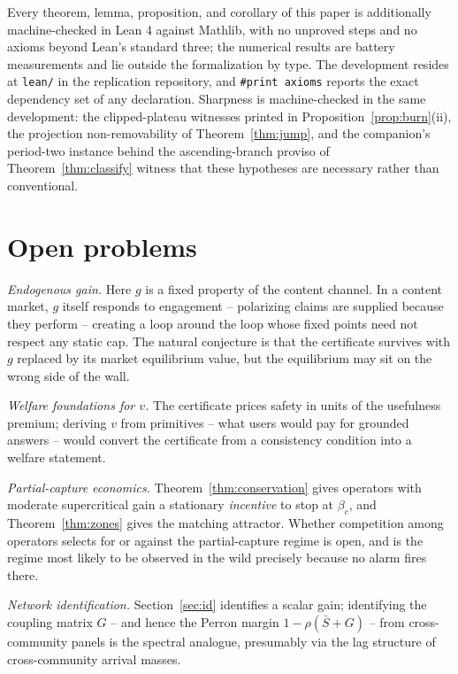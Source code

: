 \documentclass[11pt]{article}
\theoremstyle{definition}
\theoremstyle{remark}
\numberwithin{equation}{section}
\begin{document}
Every theorem, lemma, proposition, and corollary of this paper is additionally machine-checked in Lean 4 against Mathlib, with no unproved steps and no axioms beyond Lean's standard three; the numerical results are battery measurements and lie outside the formalization by type. The development resides at \texttt{lean/} in the replication repository, and \texttt{\#print axioms} reports the exact dependency set of any declaration. Sharpness is machine-checked in the same development: the clipped-plateau witnesses printed in Proposition~\ref{prop:burn}(ii), the projection non-removability of Theorem~\ref{thm:jump}, and the companion's period-two instance behind the ascending-branch proviso of Theorem~\ref{thm:classify} witness that these hypotheses are necessary rather than conventional.

\section{Open problems}\label{sec:open}

\emph{Endogenous gain.} Here $g$ is a fixed property of the content channel. In a content market, $g$ itself responds to engagement -- polarizing claims are supplied because they perform -- creating a loop around the loop whose fixed points need not respect any static cap. The natural conjecture is that the certificate survives with $g$ replaced by its market equilibrium value, but the equilibrium may sit on the wrong side of the wall.

\emph{Welfare foundations for $v$.} The certificate prices safety in units of the usefulness premium; deriving $v$ from primitives -- what users would pay for grounded answers -- would convert the certificate from a consistency condition into a welfare statement.

\emph{Partial-capture economics.} Theorem~\ref{thm:conservation} gives operators with moderate supercritical gain a stationary \emph{incentive} to stop at $\beta_c$, and Theorem~\ref{thm:zones} gives the matching attractor. Whether competition among operators selects for or against the partial-capture regime is open, and is the regime most likely to be observed in the wild precisely because no alarm fires there.

\emph{Network identification.} Section~\ref{sec:id} identifies a scalar gain; identifying the coupling matrix $G$ -- and hence the Perron margin $1-\rho(\bar S+G)$ -- from cross-community panels is the spectral analogue, presumably via the lag structure of cross-community arrival masses.
\end{document}

